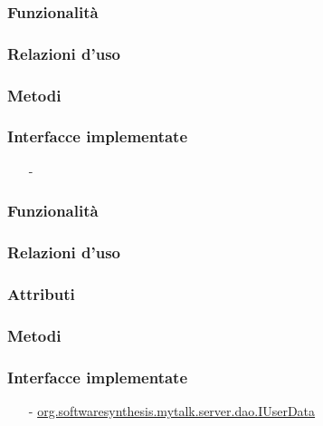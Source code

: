 
\subsubsection*{Funzionalità}

\subsubsection*{Relazioni d'uso}

\subsubsection*{Metodi}


\subsubsection*{Interfacce implementate}
\begin{itemize}[noitemsep,nolistsep]
  \item[-] 
\end{itemize}

\subsubsection*{Funzionalità}

\subsubsection*{Relazioni d'uso}

\subsubsection*{Attributi}

\subsubsection*{Metodi}


\subsubsection*{Interfacce implementate}
\begin{itemize}[noitemsep,nolistsep]
  \item[-] \hyperref[IUserData]{\ttfamily{}org.softwaresynthesis.mytalk.server.dao.IUserData}
\end{itemize}

